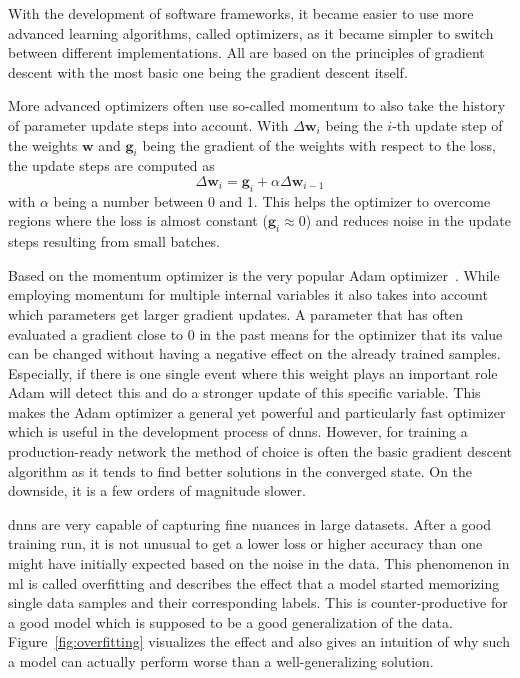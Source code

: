 
With the development of software frameworks, it became easier to use more advanced learning algorithms, called optimizers, as it became simpler to switch between different implementations. All are based on the principles of gradient descent with the most basic one being the gradient descent itself.

More advanced optimizers often use so-called momentum to also take the history of parameter update steps into account. With \(\Delta \bm w_i\) being the \(i\)-th update step of the weights \(\bm w\) and \(\bm g_i\) being the gradient of the weights with respect to the loss, the update steps are computed as \begin{equation}
    \Delta \bm w_i = \bm g_i + \alpha \Delta \bm w_{i-1}
\end{equation} with \(\alpha \) being a number between 0 and 1. This helps the optimizer to overcome regions where the loss is almost constant (\(\bm g_i \approx 0\)) and reduces noise in the update steps resulting from small batches.

Based on the momentum optimizer is the very popular Adam optimizer~\cite{adam}. While employing momentum for multiple internal variables it also takes into account which parameters get larger gradient updates. A parameter that has often evaluated a gradient close to 0 in the past means for the optimizer that its value can be changed without having a negative effect on the already trained samples. Especially, if there is one single event where this weight plays an important role Adam will detect this and do a stronger update of this specific variable. This makes the Adam optimizer a general yet powerful and particularly fast optimizer which is useful in the development process of \glspl{dnn}. However, for training a production-ready network the method of choice is often the basic gradient descent algorithm as it tends to find better solutions in the converged state. On the downside, it is a few orders of magnitude slower.


\glspl{dnn} are very capable of capturing fine nuances in large datasets. After a good training run, it is not unusual to get a lower loss or higher accuracy than one might have initially expected based on the noise in the data. This phenomenon in \gls{ml} is called overfitting and describes the effect that a model started memorizing single data samples and their corresponding labels. This is counter-productive for a good model which is supposed to be a good generalization of the data. Figure~\ref{fig:overfitting} visualizes the effect and also gives an intuition of why such a model can actually perform worse than a well-generalizing solution.

